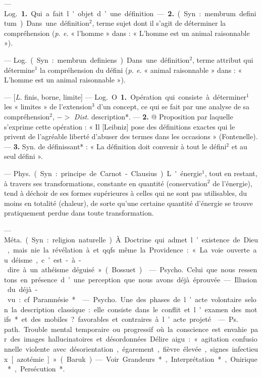 \begin{itemize}[leftmargin=1cm, label=, itemsep=1pt]
 — \si{Log.} {\bf 1.} Qui a fait l'objet
d’une définition. — {\bf 2.} (Syn. : membrum definitum). Dans une définition$^2$, terme sujet dont il s’agit de
déterminer la compréhension ({\it p. e.}
« l'homme » dans : « L'homme est un
animal raisonnable »).

 — \si{Log.} (Syn. : membrun
definiens). Dans une définition$^2$,
terme attribut qui détermine$^1$ la
compréhension du défini ({\it p. e.} « animal raisonnable » dans : « L’homme
est un animal raisonnable »).

 — [{\it L.} finis, borne, limite]
— \si{Log.} O {\bf 1.} Opération qui consiste à
déterminer$^1$ les « limites » de l’extension$^3$ d’un concept, ce qui se fait par
une analyse de sa compréhension$^2$,
$->$ {\it Dist.} description*. — {\bf 2.} @ Proposition par laquelle s’exprime cette
opération : « Il [Leibniz] pose des
définitions exactes qui le privent de
l’agréable liberté d’abuser des termes
dans les occasions » (Fontenelle). —
 {\bf 3.} Syn. de définissant* : « La définition doit convenir à tout le défini$^2$
et au seul défini ».

 — \si{Phys.}
(Syn. : principe de Carnot-Clausius).
L'énergie$^1$, tout en restant, à travers ses transformations, constante
en quantité (conservation$^2$ de l’énergie), tend à déchoir de ses formes
supérieures à celles qui ne sont pas
utilisables, du moins en totalité
(chaleur), de sorte qu’une certaine
quantité d'énergie se trouve pratiquement perdue dans toute transformation.

 — \si{Méta.} (Syn. : religion naturelle). À. Doctrine qui admet l’existence de Dieu, mais nie la révélation
à et qqfs. même la Providence : « La
voie ouverte au déisme, c’est-à-dire
à un athéisme déguisé » (Bossuet).

 — \si{Psycho.}
Celui que nous ressentons en présence d’une perception que nous
avons déjà éprouvée. — Illusion du
déjà-vu : cf. Paramnésie*.

 — \si{Psycho.} Une des
phases de l’acte volontaire selon la
description classique : elle consiste 
dans le conflit et l'examen des motifs* et des mobiles? favorables et
contraires à l’acte projeté.

 — \si{Ps. path.} Trouble mental
temporaire ou progressif où la conscience est envahie par des images
hallucinatoires et désordonnées. Délire aigu : « agitation confusionnelle
violente avec désorientation, égarement, fièvre élevée, signes infectieux [azotémie] » (Baruk). — Voir
Grandeurs*, Interprétation*, Onirique*, Persécution*.


\end{itemize}
